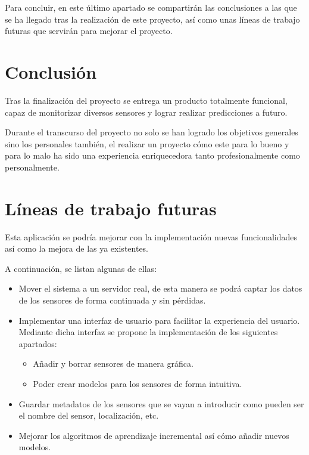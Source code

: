 
Para concluir, en este último apartado se compartirán las conclusiones a las que se ha llegado tras la realización de este proyecto, así como unas líneas de trabajo futuras que servirán para mejorar el proyecto.

\section{Conclusión}

Tras la finalización del proyecto se entrega un producto totalmente funcional, capaz de monitorizar diversos sensores y lograr realizar predicciones a futuro.

Durante el transcurso del proyecto no solo se han logrado los objetivos generales sino los personales también, el realizar un proyecto cómo este para lo bueno y para lo malo ha sido una experiencia enriquecedora tanto profesionalmente como personalmente.


\section{Líneas de trabajo futuras}
Esta aplicación se podría mejorar con la implementación nuevas funcionalidades así como la mejora de las ya existentes.

A continuación, se listan algunas de ellas:
\begin{itemize}
    \item Mover el sistema a un servidor real, de esta manera se podrá captar los datos de los sensores de forma continuada y sin pérdidas.
    \item Implementar una interfaz de usuario para facilitar la experiencia del usuario. Mediante dicha interfaz se propone la implementación de los siguientes apartados:
    \begin{itemize}
        \item Añadir y borrar sensores de manera gráfica.
        \item Poder crear modelos para los sensores de forma intuitiva.
    \end{itemize}
    \item Guardar metadatos de los sensores que se vayan a introducir como pueden ser el nombre del sensor, localización, etc.
    \item Mejorar los algoritmos de aprendizaje incremental así cómo añadir nuevos modelos.
\end{itemize}